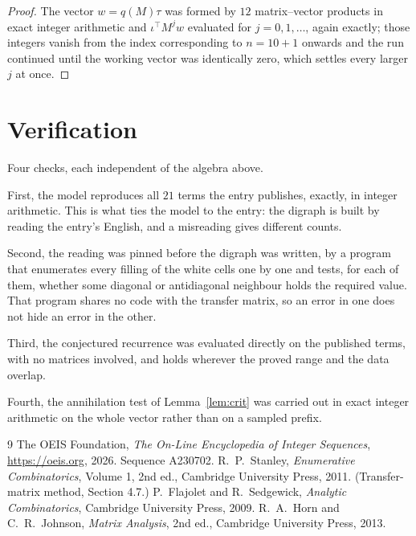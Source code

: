 \documentclass[11pt,a4paper]{article}
\theoremstyle{plain}
\theoremstyle{definition}
\begin{document}
\begin{proof}
The vector $w=q(M)\tau$ was formed by $12$ matrix--vector products in exact integer
arithmetic and $\iota^{\!\top}M^{j}w$ evaluated for $j=0,1,\dots$, again exactly; those
integers vanish from the index corresponding to $n=10+1$ onwards and the run continued
until the working vector was identically zero, which settles every larger $j$ at once.
\end{proof}

\section{Verification}

Four checks, each independent of the algebra above.

First, the model reproduces all $21$ terms the entry publishes, exactly, in integer
arithmetic. This is what ties the model to the entry: the digraph is built by reading the
entry's English, and a misreading gives different counts.

Second, the reading was pinned before the digraph was written, by a program that enumerates
every filling of the white cells one by one and tests, for each of them, whether some
diagonal or antidiagonal neighbour holds the required value. That program shares no code with the transfer matrix, so an error in one does not
hide an error in the other.

Third, the conjectured recurrence was evaluated directly on the published terms, with no
matrices involved, and holds wherever the proved range and the data overlap.

Fourth, the annihilation test of Lemma~\ref{lem:crit} was carried out in exact integer
arithmetic on the whole vector rather than on a sampled prefix.

\begin{thebibliography}{9}
 The OEIS Foundation, \emph{The On-Line Encyclopedia of Integer
Sequences}, \url{https://oeis.org}, 2026. Sequence A230702.
 R.~P.~Stanley, \emph{Enumerative Combinatorics}, Volume 1, 2nd ed.,
Cambridge University Press, 2011. (Transfer-matrix method, Section 4.7.)
 P.~Flajolet and R.~Sedgewick, \emph{Analytic Combinatorics}, Cambridge
University Press, 2009.
 R.~A.~Horn and C.~R.~Johnson, \emph{Matrix Analysis}, 2nd ed., Cambridge
University Press, 2013.
\end{thebibliography}
\end{document}
